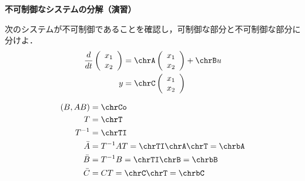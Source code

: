 \newpage

\noindent
{\bf 不可制御なシステムの分解（演習）}

次のシステムが不可制御であることを確認し，可制御な部分と不可制御な部分に分けよ．
\begin{align*}
	\frac{d}{dt} \statev 
	&= \chrA \statev + \chrB u
\\
	y 
	&= \chrC \statev
\end{align*}



\begin{align*}
	(B, AB) & = \chrCo
\\
	T &= \chrT
\\
	T^{-1} &= \chrTI
\\
	\bar{A} &= T^{-1} A T
	= \chrTI \chrA \chrT
	= \chrbA
\\
	\bar{B}
	&= T^{-1} B
	= \chrTI \chrB
	= \chrbB
\\
	\bar{C}
	&= 	C T
	= \chrC \chrT
	= \chrbC
\end{align*}





